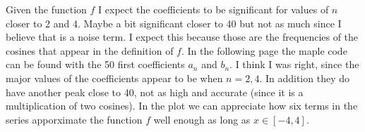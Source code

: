 \begin{questions}

\begin{solution}
Given the function $f$ I expect the coefficients to be significant for values of $n$ closer to 2 and 4. Maybe a bit significant closer to 40 but not as much since I believe that is a noise term. I expect this because those are the frequencies of the cosines that appear in the definition of $f$. In the following page the maple code can be found with the 50 first coefficients $a_n$ and $b_n$. I think I was right, since the major values of the coefficients appear to be when $n=2,4$. In addition they do have another peak close to 40, not as high and accurate (since it is a multiplication of two cosines). In the plot we can appreciate how six terms in the series apporximate the function $f$ well enough as long as $x\in[-4,4]$.
\end{solution}
\end{questions}

